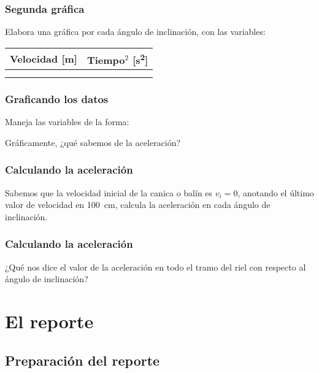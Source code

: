 \documentclass[14pt]{beamer}
\begin{document}
\begin{frame}
\frametitle{Segunda gráfica}
Elabora una gráfica por cada ángulo de inclinación, con las variables:
\begin{table}
    \centering
    \begin{tabular}{c | c}
        Velocidad [\unit{\meter}] & Tiempo$^{2}$ [\unit{\square\second}]\\ \hline
         & \\ \hline       
         & \\ \hline       
    \end{tabular}
\end{table}
\end{frame}
\begin{frame}
\frametitle{Graficando los datos}
Maneja las variables de la forma:
\begin{figure}
    \centering
\end{figure}
Gráficamente, ¿qué sabemos de la aceleración?
\end{frame}
\begin{frame}
\frametitle{Calculando la aceleración}
Sabemos que la velocidad inicial de la canica o balín es $v_{i} = 0$, anotando el último valor de velocidad en \SI{100}{\centi\meter}, calcula la aceleración en cada ángulo de inclinación.
\end{frame}
\begin{frame}
\frametitle{Calculando la aceleración}
¿Qué nos dice el valor de la aceleración en todo el tramo del riel con respecto al ángulo de inclinación?
\end{frame}

\section{El reporte}
\subsection{Preparación del reporte}
\end{document}
